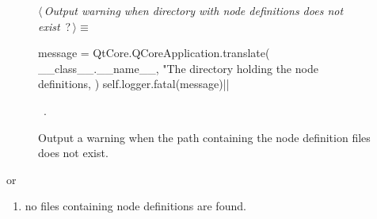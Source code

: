 \documentclass[%
    a4paper,    %
    justified,  %
    nobib,      %
    openany     %
]{tufte-book}
\makeatletter
\renewcommand{\label}[1]{\@tufte@label{##1}}%
\def\tuftebreak{%
  \if@nobreak\else
    \par
    \ifdim\lastskip<\tufteskipamount
      \removelastskip \penalty -100
      \tufteskip
    \fi
  \fi
}
\makeatother
\begin{document}
\begin{figure}[!h]
  \begin{flushleft} \small
\begin{minipage}{\linewidth}\label{scrap9}\raggedright\small
{} $\langle\,${\itshape Output warning when directory with node definitions does not exist}\nobreak\ {\footnotesize {?}}$\,\rangle\equiv$
\vspace{-1ex}
\begin{pythoncode}
    message = QtCore.QCoreApplication.translate(
        __class__.__name__,
        "The directory holding the node definitions, %
    )
    self.logger.fatal(message)|\NWsep|
\end{pythoncode}
\vspace{1.5ex}
\footnotesize
\begin{list}{}{\setlength{\itemsep}{-\parsep}\setlength{\itemindent}{-\leftmargin}}
\item \NWtxtMacroRefIn\ .

\item{}
\end{list}
\end{minipage}\vspace{4ex}
\end{flushleft}
\caption{Output a warning when the path containing the node definition files
    does not exist.}
  \label{lst:nodes-controller-load-node-defs-warning}
\end{figure}

\tuftebreak{}or

\begin{enumerate}[resume]
  \item no files containing node definitions are found.
\end{enumerate}
  
\end{document}
